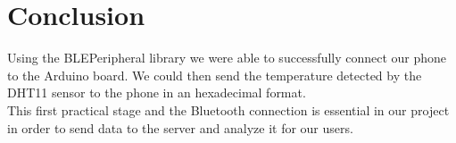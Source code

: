 \section{Conclusion}
Using the BLEPeripheral library we were able to successfully connect our phone to the Arduino board. We could then send the temperature detected by the DHT11 sensor to the phone in an hexadecimal format.\\
This first practical stage and the Bluetooth connection is essential in our project in order to send data to the server and analyze it for our users.


